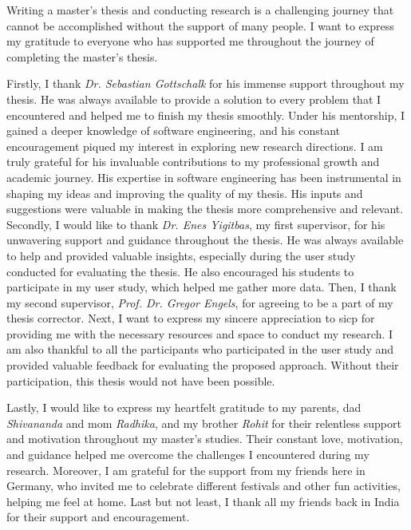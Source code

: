 
\begin{acknowledgements}      


Writing a master's thesis and conducting research is a challenging journey that cannot be accomplished without the support of many people. 
I want to express my gratitude to everyone who has supported me throughout the journey of completing the master's thesis.

Firstly, I thank \textit{Dr. Sebastian Gottschalk} for his immense support throughout my thesis. 
He was always available to provide a solution to every problem that I encountered and helped me to finish my thesis smoothly.
Under his mentorship, I gained a deeper knowledge of software engineering, and his constant encouragement piqued my interest in exploring new research directions. 
I am truly grateful for his invaluable contributions to my professional growth and academic journey.
His expertise in software engineering has been instrumental in shaping my ideas and improving the quality of my thesis. 
His inputs and suggestions were valuable in making the thesis more comprehensive and relevant.
Secondly, I would like to thank \textit{Dr. Enes Yigitbas}, my first supervisor, for his unwavering support and guidance throughout the thesis. 
He was always available to help and provided valuable insights, especially during the user study conducted for evaluating the thesis. 
He also encouraged his students to participate in my user study, which helped me gather more data.
Then, I thank my second supervisor, \textit{Prof. Dr. Gregor Engels}, for agreeing to be a part of my thesis corrector.
Next, I want to express my sincere appreciation to \ac{sicp} for providing me with the necessary resources and space to conduct my research.
I am also thankful to all the participants who participated in the user study and provided valuable feedback for evaluating the proposed approach. Without their participation, this thesis would not have been possible.

Lastly, I would like to express my heartfelt gratitude to my parents, dad \textit{Shivananda} and mom \textit{Radhika}, and my brother \textit{Rohit} for their relentless support and motivation throughout my master's studies. 
Their constant love, motivation, and guidance helped me overcome the challenges I encountered during my research. 
Moreover, I am grateful for the support from my friends here in Germany, who invited me to celebrate different festivals and other fun activities, helping me feel at home.
Last but not least, I thank all my friends back in India for their support and encouragement.
\end{acknowledgements}